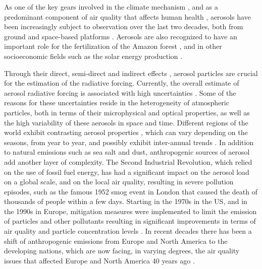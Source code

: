 \documentclass[acp, manuscript]{copernicus}
\begin{document}


\introduction  %
As one of the key gears involved in the climate mechanism \citep{poschl2005atmospheric}, and as a predominant component of air quality that affects human health \citep{burnett2014integrated}, aerosols have been increasingly subject to observation over the last two decades, both from ground and space-based platforms \citep{holben2001emerging,kaufman2002satellite}.  Aerosols are also recognized to have an important role for the fertilization of the Amazon forest \citep{yu2015fertilizing}, and in other socioeconomic fields such as the solar energy production \citep{Li11867,labordena2018blue,Sweerts2019}.

Through their direct, semi-direct and indirect effects \citep{rap2013natural,johnson2004semi,lohmann2005global}, aerosol particles are crucial for the estimation of the radiative forcing. Currently, the overall estimate of aerosol radiative forcing is associated with high uncertainties \citep{haywood2000estimates, stocker2014climate}. Some of the reasons for these uncertainties reside in the heterogeneity of atmospheric particles, both in terms of their microphysical and optical properties, as well as the high variability of these aerosols in space and time. Different regions of the world exhibit contrasting aerosol properties \citep{holben2001emerging}, which can vary depending on the seasons, from year to year, and possibly exhibit inter-annual trends \citep{streets2009anthropogenic}. In addition to natural emissions such as sea salt and dust, anthropogenic sources of aerosol add another layer of complexity. The Second Industrial Revolution, which relied on the use of fossil fuel energy, has had a significant impact on the aerosol load on a global scale, and on the local air quality, resulting in severe pollution episodes, such as the famous 1952 smog event in London \citep{bell2004retrospective} that caused the death of thousands of people within a few days.
Starting in the 1970s in the US, and in the 1990s in Europe, mitigation measures were implemented to limit the emission of particles and other pollutants \citep{bryner1995blue,turnock2016impact} resulting in significant improvements in terms of air quality and particle concentration levels \citep{likens2001long}. In recent decades there has been a shift of anthropogenic emissions from Europe and North America to the developing nations, which are now facing, in varying degrees, the air quality issues that affected Europe and North America 40 years ago \citep{streets2008aerosol,ramachandran2012aerosol}.
\end{document}
